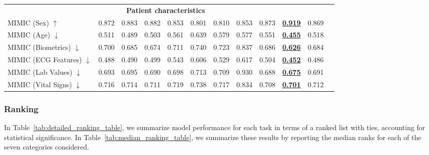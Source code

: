 \documentclass{article}
\begin{document}
\begin{table}[t]
\begin{tabular}{lccccccccccc}
                    \multicolumn{11}{c}{\textbf{Patient characteristics}} \\
                    MIMIC (Sex) $\uparrow$ & 0.872 & 0.883 & 0.882 & 0.853 & 0.801 & 0.810 & 0.853 & 0.873 & \textbf{\underline{0.919}} & 0.869 \\
                    MIMIC (Age) $\downarrow$ & 0.511 & 0.489 & 0.503 & 0.561 & 0.639 & 0.579 & 0.577 & 0.551 & \textbf{\underline{0.455}} & 0.518 \\
                    MIMIC (Biometrics) $\downarrow$ & 0.700 & 0.685 & 0.674 & 0.711 & 0.740 & 0.723 & 0.837 & 0.686 & \textbf{\underline{0.626}} & 0.684 \\
                    MIMIC (ECG Features) $\downarrow$ & 0.488 & 0.490 & 0.499 & 0.543 & 0.606 & 0.529 & 0.617 & 0.504 & \textbf{\underline{0.452}} & 0.486 \\
                    MIMIC (Lab Values) $\downarrow$ & 0.693 & 0.695 & 0.690 & 0.698 & 0.713 & 0.709 & 0.930 & 0.688 & \textbf{\underline{0.675}} & 0.691 \\
                    MIMIC (Vital Signs) $\downarrow$ & 0.716 & 0.714 & 0.711 & 0.719 & 0.738 & 0.717 & 0.834 & 0.708 & \textbf{\underline{0.701}} & 0.712 \\
        
                    
                    \bottomrule
                \end{tabular}
            \end{table}


            \subsubsection{Ranking}
            In Table~\ref{tab:detailed_ranking_table}, we summarize model performance for each task in terms of a ranked list with ties, accounting for statistical significance. In Table~\ref{tab:median_ranking_table}, we summarize these results by reporting the median ranks for each of the seven categories considered.
\end{document}
